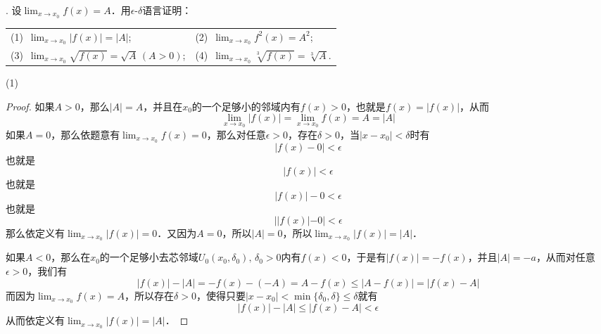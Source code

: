 . 设$\displaystyle\lim_{x \to x_0} f(x) = A$．用$\epsilon$-$\delta$语言证明：
\begin{table}[H]
    \centering
    \begin{tabularx}{0.8\textwidth} {  >{\raggedright\arraybackslash}X >{\raggedright\arraybackslash}X  }
       (1)~$\displaystyle\lim_{x \to x_0} |f(x)| = |A|$; & (2)~$\displaystyle\lim_{x \to x_0} f^2(x)=A^2$; \\ [1em]
       (3)~$\displaystyle\lim_{x \to x_0} \sqrt{f(x)} = \sqrt{A} \, (A > 0)$; & (4)~$\displaystyle\lim_{x \to x_0} \sqrt[3]{f(x)} = \sqrt[3]{A}$.
      \end{tabularx}
\end{table}

\noindent (1) 
\begin{proof}
如果$A > 0$，那么$|A|=A$，并且在$x_0$的一个足够小的邻域内有$f(x) > 0$，也就是$f(x) = |f(x)|$，从而
\begin{equation}
    \lim_{x \to x_0} |f(x)| = \lim_{x \to x_0} f(x) = A = |A|
\end{equation}
如果$A = 0$，那么依题意有$\displaystyle\lim_{x \to x_0} f(x) = 0$，那么对任意$\epsilon > 0$，存在$\delta > 0$，当$|x - x_0| < \delta$时有
\begin{equation}
    |f(x) - 0 | < \epsilon
\end{equation}
也就是
\begin{equation}
    |f(x)| < \epsilon
\end{equation}
也就是
\begin{equation}
    |f(x)| - 0 < \epsilon
\end{equation}
也就是
\begin{equation}
    ||f(x)| - 0| < \epsilon
\end{equation}
那么依定义有$\displaystyle\lim_{x \to x_0} |f(x)| = 0$．又因为$A = 0$，所以$|A| = 0$，所以$\displaystyle\lim_{x \to x_0} |f(x)| = |A|$．

\noindent 如果$A < 0$，那么在$x_0$的一个足够小去芯邻域$U_0(x_0, \delta_0), \, \delta_0 > 0$内有$f(x) < 0$，于是有$|f(x)|=-f(x)$，并且$|A|=-a$，从而对任意$\epsilon > 0$，我们有
\begin{equation}
    |f(x)| - |A| = -f(x) - (-A) = A - f(x) \leq |A - f(x)| = |f(x) - A| 
\end{equation}
而因为$\displaystyle\lim_{x \to x_0} f(x) = A$，所以存在$\delta > 0$，使得只要$|x-x_0|<\min\{\delta_0, \delta \} \leq \delta$就有
\begin{equation}
    |f(x)|-|A| \leq |f(x) - A| < \epsilon
\end{equation}
从而依定义有$\displaystyle\lim_{x \to x_0} |f(x)| = |A|$．
\end{proof}

